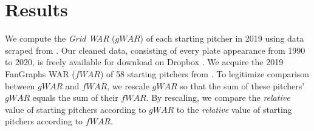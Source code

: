 \documentclass[12pt]{article}
\begin{document}







\section{Results}

We compute the \textit{Grid WAR} ($gWAR$) of each starting pitcher in 2019 using data scraped from \citet{retroRaw}. Our cleaned data, consisting of every plate appearance from 1990 to 2020, is freely available for download on Dropbox \citep{dropboxRetrosheet}. We acquire the 2019 FanGraphs WAR ($fWAR$) of 58 starting pitchers from \citet{Fangraphs2019War}. To legitimize comparison between $gWAR$ and $fWAR$, we rescale $gWAR$ so that the sum of these pitchers' $gWAR$ equals the sum of their $fWAR$. By rescaling, we compare the \textit{relative} value of starting pitchers according to $gWAR$ to the \textit{relative} value of starting pitchers according to $fWAR$. 
\end{document}

